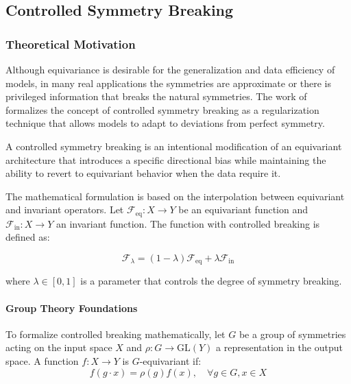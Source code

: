 \subsection{Controlled Symmetry Breaking}

\subsubsection{Theoretical Motivation}

Although equivariance is desirable for the generalization and data efficiency of models, in many real applications the symmetries are approximate or there is privileged information that breaks the natural symmetries. The work of \citet{vanderouderaa2024symmetry} formalizes the concept of controlled symmetry breaking as a regularization technique that allows models to adapt to deviations from perfect symmetry.

\begin{definition}
A controlled symmetry breaking is an intentional modification of an equivariant architecture that introduces a specific directional bias while maintaining the ability to revert to equivariant behavior when the data require it.
\end{definition}

The mathematical formulation is based on the interpolation between equivariant and invariant operators. Let $\mathcal{F}_{\text{eq}}: X \to Y$ be an equivariant function and $\mathcal{F}_{\text{in}}: X \to Y$ an invariant function. The function with controlled breaking is defined as:

\begin{equation}
\mathcal{F}_\lambda = (1-\lambda) \mathcal{F}_{\text{eq}} + \lambda \mathcal{F}_{\text{in}}
\end{equation}

where $\lambda \in [0,1]$ is a parameter that controls the degree of symmetry breaking.

\paragraph{Group Theory Foundations}

To formalize controlled breaking mathematically, let $G$ be a group of symmetries acting on the input space $X$ and $\rho: G \to \text{GL}(Y)$ a representation in the output space. A function $f: X \to Y$ is $G$-equivariant if:
\begin{equation}
f(g \cdot x) = \rho(g) f(x), \quad \forall g \in G, x \in X
\end{equation}

